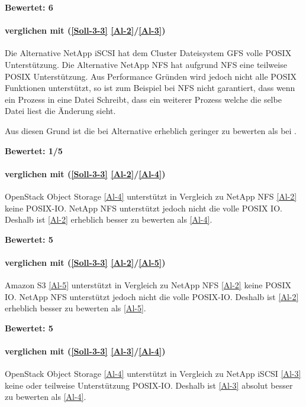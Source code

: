 \textbf{Bewertet: 6}


\paragraph*{  verglichen mit  (\ref{Soll-3-3} \ref{Al-2}/\ref{Al-3})}
Die Alternative NetApp iSCSI  hat dem Cluster Dateisystem GFS volle POSIX Unterstützung. Die Alternative NetApp NFS  hat aufgrund NFS eine teilweise POSIX Unterstützung. Aus Performance Gründen wird jedoch nicht alle POSIX Funktionen unterstützt, so ist zum Beispiel bei NFS nicht garantiert, dass wenn ein Prozess in eine Datei Schreibt, dass ein weiterer Prozess welche die selbe Datei liest die Änderung sieht. \cite{O'Keefe2005}

Aus diesen Grund ist die  bei Alternative erheblich  geringer zu bewerten als bei .

\textbf{Bewertet: 1/5}

\paragraph*{  verglichen mit  (\ref{Soll-3-3} \ref{Al-2}/\ref{Al-4})}
OpenStack Object Storage \ref{Al-4} unterstützt in Vergleich zu NetApp NFS \ref{Al-2} keine POSIX-IO. NetApp NFS unterstützt jedoch nicht die volle POSIX IO. Deshalb ist \ref{Al-2} erheblich besser zu bewerten als \ref{Al-4}.

\textbf{Bewertet: 5}

\paragraph*{  verglichen mit  (\ref{Soll-3-3} \ref{Al-2}/\ref{Al-5})}
Amazon S3 \ref{Al-5} unterstützt in Vergleich zu NetApp NFS \ref{Al-2} keine POSIX IO. NetApp NFS unterstützt jedoch nicht die volle POSIX-IO. Deshalb ist \ref{Al-2} erheblich besser zu bewerten als \ref{Al-5}.

\textbf{Bewertet: 5}

\paragraph*{  verglichen mit  (\ref{Soll-3-3} \ref{Al-3}/\ref{Al-4})}
OpenStack Object Storage \ref{Al-4} unterstützt in Vergleich zu NetApp iSCSI \ref{Al-3} keine oder teilweise Unterstützung POSIX-IO. Deshalb ist \ref{Al-3} absolut besser zu bewerten als \ref{Al-4}.

